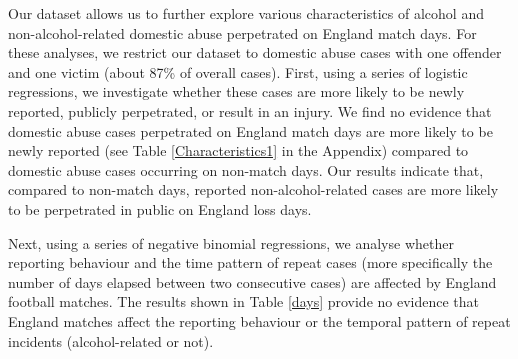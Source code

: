 \documentclass[12pt, a4paper]{article}
\begin{document}
Our dataset allows us to further explore various characteristics of alcohol and non-alcohol-related domestic abuse perpetrated on England match days. For these analyses, we restrict our dataset to domestic abuse cases with one offender and one victim (about 87\% of overall cases). First, using a series of logistic regressions, we investigate whether these cases are more likely to be newly reported, publicly perpetrated, or result in an injury. We find no evidence that domestic abuse cases perpetrated on England match days are more likely to be newly reported (see Table \ref{Characteristics1} in the Appendix) compared to domestic abuse cases occurring on non-match days. Our results indicate that, compared to non-match days, reported non-alcohol-related cases are more likely to be perpetrated in public on England loss days. 







Next, using a series of negative binomial regressions, we analyse whether reporting behaviour and the time pattern of repeat cases (more specifically the number of days elapsed between two consecutive cases) are affected by England football matches. The results shown in Table \ref{days} provide no evidence that England matches affect the reporting behaviour or the temporal pattern of repeat incidents (alcohol-related or not).
\end{document}
